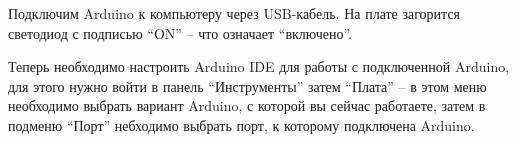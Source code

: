 \documentclass[../sparc.tex]{subfiles}
\begin{document}
Подключим Arduino к компьютеру через USB-кабель.  На плате загорится светодиод с
подписью ``ON'' -- что означает ``включено''.

Теперь необходимо настроить Arduino IDE для работы с подключенной Ardu\-ino, для
этого нужно войти в панель ``Инструменты'' затем ``Плата'' -- в этом меню
необходимо выбрать вариант Arduino, с которой вы сейчас работаете, затем в
подменю ``Порт'' небходимо выбрать порт, к которому подключена Arduino.
\end{document}
